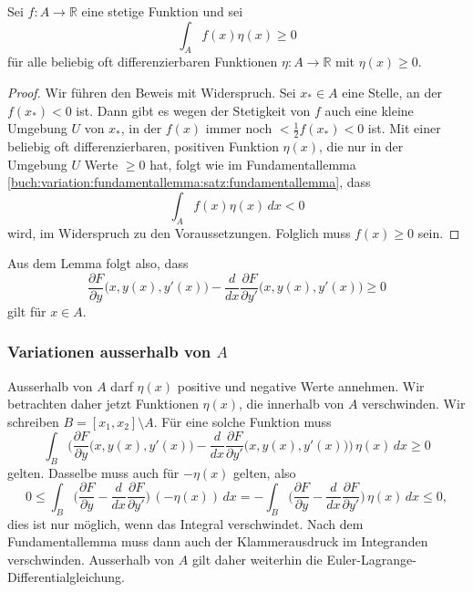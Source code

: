\begin{satz}
Sei $f\colon A\to\mathbb{R}$ eine stetige Funktion und sei
\[
\int_A f(x)\eta(x)\ge 0
\]
für alle beliebig oft differenzierbaren Funktionen $\eta\colon A\to\mathbb{R}$
mit $\eta(x)\ge 0$.
\end{satz}

\begin{proof}
Wir führen den Beweis mit Widerspruch.
Sei $x_*\in A$ eine Stelle, an der $f(x_*)<0$ ist.
Dann gibt es wegen der Stetigkeit von $f$ auch eine kleine Umgebung $U$ von
$x_*$, in der $f(x)$ immer noch $<\frac12f(x_*)<0$ ist.
Mit einer beliebig oft differenzierbaren, positiven Funktion $\eta(x)$,
die nur in der Umgebung $U$ Werte $\ge 0$ hat, folgt wie im
Fundamentallemma \ref{buch:variation:fundamentallemma:satz:fundamentallemma},
dass
\[
\int_A f(x)\eta(x)\,dx < 0
\]
wird, im Widerspruch zu den Voraussetzungen.
Folglich muss $f(x)\ge 0$ sein.
\end{proof}

Aus dem Lemma folgt also, dass
\begin{equation}
\frac{\partial F}{\partial y}\bigl(x,y(x),y'(x)\bigr)
-
\frac{d}{dx}
\frac{\partial F}{\partial y'}\bigl(x,y(x),y'(x)\bigr)
\ge 0
\end{equation}
gilt für $x\in A$.

%
%
\subsubsection{Variationen ausserhalb von $A$}
Ausserhalb von $A$ darf $\eta(x)$ positive und negative Werte annehmen.
Wir betrachten daher jetzt Funktionen $\eta(x)$, die innerhalb von $A$
verschwinden.
Wir schreiben $B=[x_1,x_2]\setminus A$.
Für eine solche Funktion muss
\[
\int_B \biggl(
\frac{\partial F}{\partial y}\bigl(x,y(x),y'(x)\bigr)
-
\frac{d}{dx}
\frac{\partial F}{\partial y'}\bigl(x,y(x),y'(x)\bigr)
\biggr)
\,
\eta(x)
\,dx
\ge 0
\]
gelten.
Dasselbe muss auch für $-\eta(x)$ gelten, also
\[
0
\le
\int_B \biggl(
\frac{\partial F}{\partial y}
-
\frac{d}{dx}
\frac{\partial F}{\partial y'}
\biggr)
\,
(-\eta(x))
\,dx
=
-
\int_B \biggl(
\frac{\partial F}{\partial y}
-
\frac{d}{dx}
\frac{\partial F}{\partial y'}
\biggr)
\,
\eta(x)
\,dx
\le 0,
\]
dies ist nur möglich, wenn das Integral verschwindet.
Nach dem Fundamentallemma muss dann auch der Klammerausdruck
im Integranden verschwinden.
Ausserhalb von $A$ gilt daher weiterhin die
Euler-Lagrange-Differentialgleichung.

